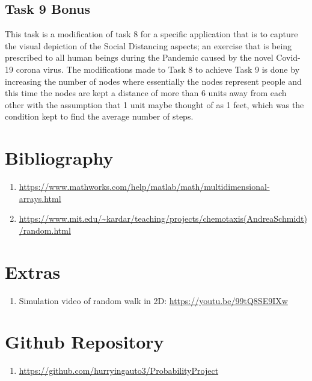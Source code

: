 \documentclass{article}
\begin{document}
\subsection{Task 9 Bonus}
This task is a modification of task 8 for a specific application that is to capture the visual depiction of the Social Distancing aspects; an exercise that is being prescribed to all human beings during the Pandemic caused by the novel Covid-19 corona virus. The modifications made to Task 8 to achieve Task 9 is done by increasing the number of nodes where essentially the nodes represent people and this time the nodes are kept a distance of more than 6 units away from each other with the assumption that 1 unit maybe thought of as 1 feet, which was the condition kept to find the average number of steps.


\newpage
\section{Bibliography}

\begin{enumerate}
    \item \url{https://www.mathworks.com/help/matlab/math/multidimensional-arrays.html}
    \item \url{https://www.mit.edu/~kardar/teaching/projects/chemotaxis(AndreaSchmidt)/random.html}
\end{enumerate}

\section{Extras}
\begin{enumerate}
    \item Simulation video of random walk in 2D: \url{https://youtu.be/99tQ8SE9IXw}
\end{enumerate}

\section{Github Repository}
\begin{enumerate}
    \item \url{https://github.com/hurryingauto3/ProbabilityProject}
\end{enumerate}
\end{document}
